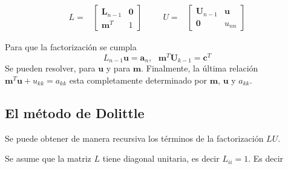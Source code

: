 \documentclass[
]{article}
\begin{document}
\begin{equation*}
\begin{array}{ccccc}
  L = & \begin{bmatrix} 
          \mathbf{L}_{n-1} & \mathbf{0} \\
          \mathbf{m}^{T}   &  1
  \end{bmatrix} & \,\,\,\,\, & 
  U =& \begin{bmatrix} 
          \mathbf{U}_{n-1} & \mathbf{u} \\
          \mathbf{0}      &  u_{nn}
  \end{bmatrix} 
\end{array}
\end{equation*}

Para que la factorización se cumpla \[
L_{n-1} \mathbf{u} = \mathbf{a}_n,\,\,\,\, \mathbf{m}^{T}\mathbf{U}_{k-1} = \mathbf{c}^{T}
\] Se pueden resolver, para \(\mathbf{u}\) y para \(\mathbf{m}\).
Finalmente, la última relación
\(\mathbf{m}^{T}\mathbf{u} + u_{kk} = a_{kk}\) esta completamente
determinado por \(\mathbf{m}\), \(\mathbf{u}\) y \(a_{kk}\).

\hypertarget{el-muxe9todo-de-dolittle-1}{%
\subsection{El método de Dolittle}\label{el-muxe9todo-de-dolittle-1}}

Se puede obtener de manera recursiva los términos de la factorización
\(LU\).

Se asume que la matriz \(L\) tiene diagonal unitaria, es decir
\(L_{ii}= 1\). Es decir
\end{document}
